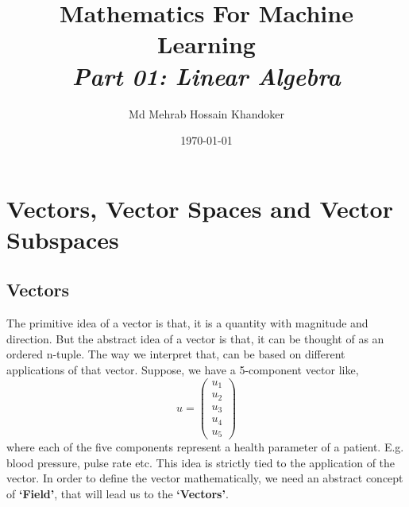 \documentclass[11pt, a4paper]{article}
\title{Mathematics For Machine Learning \\
	\large \textit{Part 01: Linear Algebra}}
\author{Md Mehrab Hossain Khandoker}
\date{\today}
\begin{document}
	
	\maketitle
	\thispagestyle{empty} %
	\newpage
	
	\tableofcontents
	\newpage
	
	\section{Vectors, Vector Spaces and Vector Subspaces}
	\subsection{Vectors}
	The primitive idea of a vector is that, it is a quantity with magnitude and direction. But the abstract idea of a vector is that, it can be thought of as an ordered n-tuple. The way we interpret that, can be based on different applications of that vector. Suppose, we have a 5-component vector like, \[
	u = \begin{pmatrix}
		u_1 \\
		u_2 \\
		u_3 \\
		u_4 \\
		u_5
	\end{pmatrix}
	\]
	where each of the five components represent a health parameter of a patient. E.g. blood pressure, pulse rate etc. This idea is strictly tied to the application of the vector. In order to define the vector mathematically, we need an abstract concept of \textbf{`Field'}, that will lead us to the \textbf{`Vectors'}.
\end{document}
